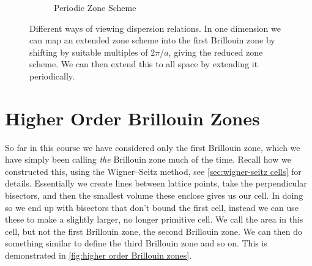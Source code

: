 \documentclass[fleqn]{NotesClass}
\begin{document}
\begin{figure}
\begin{subfigure}{\textwidth}
            \caption{Periodic Zone Scheme}
        \end{subfigure}
        \caption[Reduced dispersion relations.]{Different ways of viewing dispersion relations. In one dimension we can map an extended zone scheme into the first Brillouin zone by shifting by suitable multiples of \(2\pi/a\), giving the reduced zone scheme. We can then extend this to all space by extending it periodically.}
    \end{figure}

    \section{Higher Order Brillouin Zones}
    So far in this course we have considered only the first Brillouin zone, which we have simply been calling \emph{the} Brillouin zone much of the time.
    Recall how we constructed this, using the Wigner--Seitz method, see \cref{sec:wigner-seitz cells} for details.
    Essentially we create lines between lattice points, take the perpendicular bisectors, and then the smallest volume these enclose gives us our cell.
    In doing so we end up with bisectors that don't bound the first cell, instead we can use these to make a slightly larger, no longer primitive cell.
    We call the area in this cell, but not the first Brillouin zone, the second Brillouin zone.
    We can then do something similar to define the third Brillouin zone and so on.
    This is demonstrated in \cref{fig:higher order Brillouin zones}.
    
\end{document}
